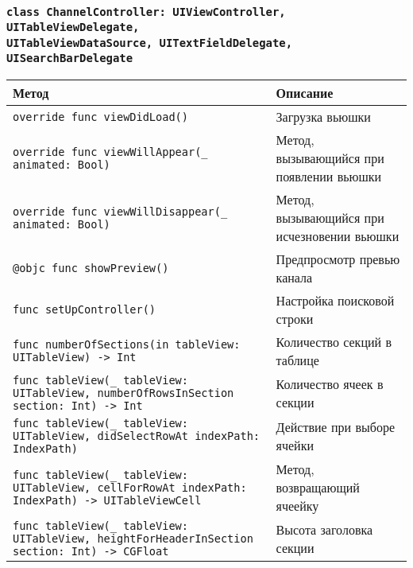 \subsubsection*{\texttt{class ChannelController: UIViewController, UITableViewDelegate,\\ UITableViewDataSource, UITextFieldDelegate, UISearchBarDelegate}}

\begin{longtable}{| >{\raggedright\arraybackslash}p{} | p{}|}
\hline
\textbf{Метод} & \textbf{Описание} \\ \hline
\texttt{override func viewDidLoad()} & {Загрузка вьюшки} \\ \hline
\texttt{override func viewWillAppear(\_ animated: Bool)} & {Метод, вызывающийся при появлении вьюшки} \\ \hline
\texttt{override func viewWillDisappear(\_ animated: Bool)} & {Метод, вызывающийся при исчезновении вьюшки} \\ \hline
\texttt{@objc func showPreview()} & {Предпросмотр превью канала} \\ \hline
\texttt{func setUpController()} & {Настройка поисковой строки} \\ \hline
\texttt{func numberOfSections(in tableView: UITableView) -> Int} & {Количество секций в таблице} \\ \hline
\texttt{func tableView(\_ tableView: UITableView, numberOfRowsInSection section: Int) -> Int} & {Количество ячеек в секции} \\ \hline
\texttt{func tableView(\_ tableView: UITableView, didSelectRowAt indexPath: IndexPath)} & {Действие при выборе ячейки} \\ \hline
\texttt{func tableView(\_ tableView: UITableView, cellForRowAt indexPath: IndexPath) -> UITableViewCell} & {Метод, возвращающий ячеейку} \\ \hline
\texttt{func tableView(\_ tableView: UITableView, heightForHeaderInSection section: Int) -> CGFloat} & {Высота заголовка секции} \\ \hline
\end{longtable}